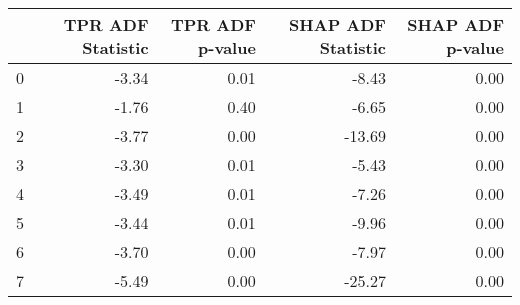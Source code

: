 \begin{tabular}{lrrrr}
\toprule
 & TPR ADF Statistic & TPR ADF p-value & SHAP ADF Statistic & SHAP ADF p-value \\
\midrule
0 & -3.34 & 0.01 & -8.43 & 0.00 \\
1 & -1.76 & 0.40 & -6.65 & 0.00 \\
2 & -3.77 & 0.00 & -13.69 & 0.00 \\
3 & -3.30 & 0.01 & -5.43 & 0.00 \\
4 & -3.49 & 0.01 & -7.26 & 0.00 \\
5 & -3.44 & 0.01 & -9.96 & 0.00 \\
6 & -3.70 & 0.00 & -7.97 & 0.00 \\
7 & -5.49 & 0.00 & -25.27 & 0.00 \\
\bottomrule
\end{tabular}
